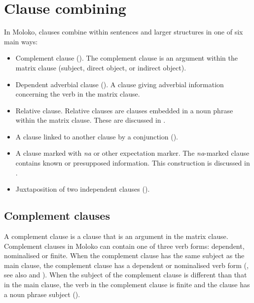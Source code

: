 \chapter[Clause combining]{Clause combining}\label{chap:12}
\hypertarget{RefHeading1213321525720847}{}
In Moloko, clauses combine within sentences and larger structures in one of six main ways: 

\begin{itemize}
\item Complement clause (). The complement clause is an argument within the matrix clause (subject, direct object, or indirect object).
\item Dependent adverbial clause (). A clause giving adverbial information concerning the verb in the matrix clause. 
\item Relative clause. Relative clauses are clauses embedded in a noun phrase within the matrix clause. These are discussed in .
\item A clause linked to another clause by a conjunction (). 
\item A clause marked with \textit{na} or other expectation marker. The \textit{na}{}-marked clause contains known or presupposed information. This construction is discussed in . 
\item Juxtaposition of two independent clauses ().
\end{itemize}

\section{Complement clauses}\label{sec:12.1}
\hypertarget{RefHeading1213341525720847}{}
A complement clause is a clause that is an argument in the matrix clause. Complement clauses in Moloko can contain one of three verb forms: dependent, nominalised or finite. When the complement clause has the same subject as the main clause, the complement clause has a dependent or nominalised verb form (, see also  and ). When the subject of the complement clause is different than that in the main clause, the verb in the complement clause is finite and the clause has a noun phrase subject (). 

